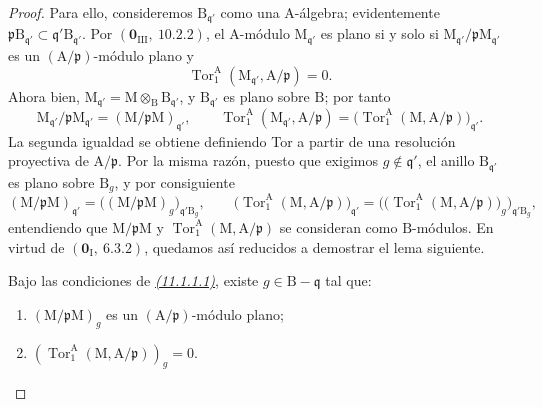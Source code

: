\begin{proof}
Para ello, consideremos $\mathrm{B}_{\mathfrak{q}'}$ como una $\mathrm{A}$-álgebra; evidentemente
$\mathfrak{p}\mathrm{B}_{\mathfrak{q}'}\subset
\mathfrak{q}'\mathrm{B}_{\mathfrak{q}'}$. Por
$(\mathbf{0}_{\mathrm{III}},~10.2.2)$, el $\mathrm{A}$-módulo
$\mathrm{M}_{\mathfrak{q}'}$ es plano si y solo si
$\mathrm{M}_{\mathfrak{q}'}/\mathfrak{p}\mathrm{M}_{\mathfrak{q}'}$ es un
$(\mathrm{A}/\mathfrak{p})$-módulo plano y
\[
  \operatorname{Tor}_1^\mathrm{A}
  (\mathrm{M}_{\mathfrak{q}'},\mathrm{A}/\mathfrak{p})=0.
\]
Ahora bien, $\mathrm{M}_{\mathfrak{q}'}=
\mathrm{M}\otimes_{\mathrm{B}}\mathrm{B}_{\mathfrak{q}'}$, y
$\mathrm{B}_{\mathfrak{q}'}$ es plano sobre $\mathrm{B}$; por tanto
\[
  \mathrm{M}_{\mathfrak{q}'}/\mathfrak{p}\mathrm{M}_{\mathfrak{q}'}
    =(\mathrm{M}/\mathfrak{p}\mathrm{M})_{\mathfrak{q}'},
  \qquad
  \operatorname{Tor}_1^\mathrm{A}
  (\mathrm{M}_{\mathfrak{q}'},\mathrm{A}/\mathfrak{p})
    =\bigl(\operatorname{Tor}_1^\mathrm{A}
      (\mathrm{M},\mathrm{A}/\mathfrak{p})\bigr)_{\mathfrak{q}'}.
\]
La segunda igualdad se obtiene definiendo Tor a partir de una resolución
proyectiva de $\mathrm{A}/\mathfrak{p}$. Por la misma razón, puesto que exigimos
$g\notin\mathfrak{q}'$, el anillo $\mathrm{B}_{\mathfrak{q}'}$ es plano sobre
$\mathrm{B}_g$, y por consiguiente
\[
  (\mathrm{M}/\mathfrak{p}\mathrm{M})_{\mathfrak{q}'}
    =\bigl((\mathrm{M}/\mathfrak{p}\mathrm{M})_g
      \bigr)_{\mathfrak{q}'\mathrm{B}_g},
  \qquad
  \bigl(\operatorname{Tor}_1^\mathrm{A}
      (\mathrm{M},\mathrm{A}/\mathfrak{p})\bigr)_{\mathfrak{q}'}
    =\bigl(\bigl(\operatorname{Tor}_1^\mathrm{A}
      (\mathrm{M},\mathrm{A}/\mathfrak{p})\bigr)_g
      \bigr)_{\mathfrak{q}'\mathrm{B}_g},
\]
entendiendo que $\mathrm{M}/\mathfrak{p}\mathrm{M}$ y
$\operatorname{Tor}_1^\mathrm{A}
(\mathrm{M},\mathrm{A}/\mathfrak{p})$ se consideran
como $\mathrm{B}$-módulos. En virtud de $(\mathbf{0}_\mathrm{I},~6.3.2)$, quedamos
así reducidos a demostrar el lema siguiente.

\begin{lemma}[11.1.1.2]
\label{IV.11.1.1.2}
Bajo las condiciones de \emph{{\hyperlink{ega4.c04.sec.11-1-1-1}{(11.1.1.1)}}}, existe $g\in\mathrm{B}-\mathfrak{q}$ tal que:
\begin{enumerate}[label=\emph{\roman*)}]
  \item $(\mathrm{M}/\mathfrak{p}\mathrm{M})_g$ es un $(\mathrm{A}/\mathfrak{p})$-módulo plano;
  \item $(\operatorname{Tor}_1^\mathrm{A}(\mathrm{M},\mathrm{A}/\mathfrak{p}))_g=0$.
\end{enumerate}
\end{lemma}


\end{proof}
